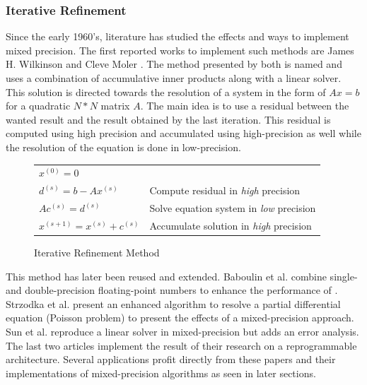 \subsubsection{Iterative Refinement}

Since the early 1960's, literature has studied the effects and ways to implement mixed precision. The first reported works to implement such methods are James H. Wilkinson \cite{Wilkinson1994} and Cleve Moler \cite{Moler1967}. The method presented by both is named  and uses a combination of accumulative inner products along with a linear solver. This solution is directed towards the resolution of a system in the form of $Ax=b$ for a quadratic $N*N$ matrix $A$. The main idea is to use a residual between the wanted result and the result obtained by the last iteration. This residual is computed using high precision and accumulated using high-precision as well while the resolution of the equation is done in low-precision.

\begin{figure}[htbp]
	\centering
\begin{tabular}{ll}
	$x^{(0)}=0$ &\\
	$d^{(s)}=b-Ax^{(s)}$ & Compute residual in \emph{high} precision\\
	$Ac^{(s)}=d^{(s)}$ & Solve equation system in \emph{low} precision\\
	$x^{(s+1)}=x^{(s)}+c^{(s)}$ & Accumulate solution in \emph{high} precision\\
\end{tabular}
	\caption[Iterative Refinement]{Iterative Refinement Method \cite{Goddeke2007}}
	\label{fig:IterativeRef}
\end{figure}

This method has later been reused and extended. Baboulin et al. \cite{Baboulin2009} combine single- and double-precision floating-point numbers to enhance the performance of . Strzodka et al. \cite{Strzodka2006} present an enhanced algorithm to resolve a partial differential equation (Poisson problem) to present the effects of a mixed-precision approach. Sun et al. \cite{Sun2008} reproduce a linear solver in mixed-precision but adds an error analysis. The last two articles implement the result of their research on a reprogrammable architecture. Several applications profit directly from these papers and their implementations of mixed-precision algorithms as seen in later sections.

